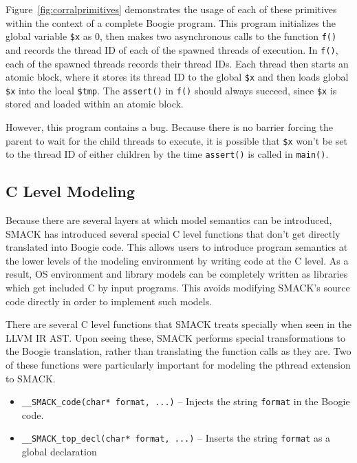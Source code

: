 Figure~\ref{fig:corralprimitives} demonstrates the usage of each of
these primitives within the context of a complete Boogie program.
This program initializes the global variable \lstinline|$x| as 0, then
makes two asynchronous calls to the function \lstinline|f()| and
records the thread ID of each of the spawned threads of execution.  In
\lstinline|f()|, each of the spawned threads records their thread IDs.
Each thread then starts an atomic block, where it stores its thread ID
to the global \lstinline|$x| and then loads global \lstinline|$x| into
the local \lstinline|$tmp|.  The \lstinline|assert()| in
\lstinline|f()| should always succeed, since \lstinline|$x| is stored
and loaded within an atomic block. 

However, this program contains a bug.  Because there is no barrier
forcing the parent to wait for the child threads to execute, it is
possible that \lstinline|$x| won't be set to the thread ID of either
children by the time \lstinline|assert()| is called in
\lstinline|main()|.

\subsection{C Level Modeling}
Because there are several layers at which model semantics can be
introduced, SMACK has introduced several special C level functions 
that don't get directly translated into Boogie code.  This allows
users to introduce program semantics at the lower levels of the
modeling environment by writing code at the C level.  As a result, OS
environment and library models can be completely written as libraries
which get included C by input programs.  This avoids modifying SMACK's
source code directly in order to implement such models.

There are several C level functions that SMACK treats specially when
seen in the LLVM IR AST.  Upon seeing these, SMACK performs special
transformations to the Boogie translation, rather than translating the
function calls as they are.  Two of these functions were particularly
important for modeling the pthread extension to SMACK.

\begin{itemize}
\item \lstinline|__SMACK_code(char* format, ...)| -- Injects the
  string \lstinline|format| in the Boogie code.
\item \lstinline|__SMACK_top_decl(char* format, ...)| -- Inserts the
  string \lstinline|format| as a global declaration 
\end{itemize}

